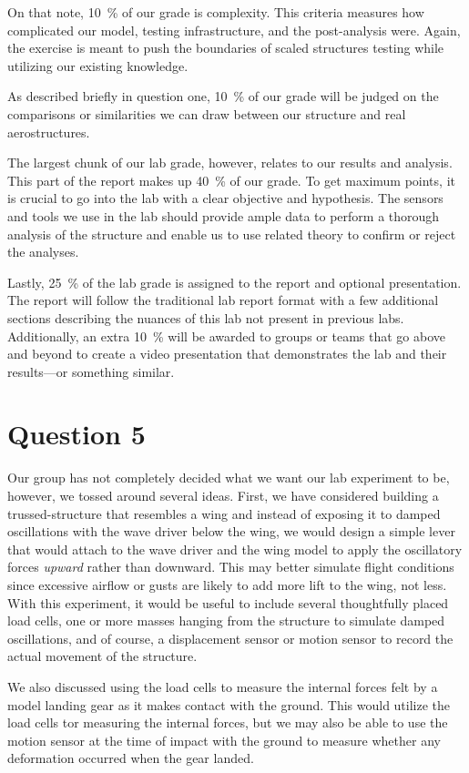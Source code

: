 \documentclass[12 pt]{article}
\begin{document}
On that note, \qty{10}{\percent} of our grade is complexity. This criteria measures how complicated our model, testing infrastructure, and the post-analysis were. Again, the exercise is meant to push the boundaries of scaled structures testing while utilizing our existing knowledge.

As described briefly in question one, \qty{10}{\percent} of our grade will be judged on the comparisons or similarities we can draw between our structure and real aerostructures.

The largest chunk of our lab grade, however, relates to our results and analysis. This part of the report makes up \qty{40}{\percent} of our grade. To get maximum points, it is crucial to go into the lab with a clear objective and hypothesis. The sensors and tools we use in the lab should provide ample data to perform a thorough analysis of the structure and enable us to use related theory to confirm or reject the analyses.

Lastly, \qty{25}{\percent} of the lab grade is assigned to the report and optional presentation. The report will follow the traditional lab report format with a few additional sections describing the nuances of this lab not present in previous labs. Additionally, an extra \qty{10}{\percent} will be awarded to groups or teams that go above and beyond to create a video presentation that demonstrates the lab and their results---or something similar.

\section*{Question 5}
Our group has not completely decided what we want our lab experiment to be, however, we tossed around several ideas. First, we have considered building a trussed-structure that resembles a wing and instead of exposing it to damped oscillations with the wave driver below the wing, we would design a simple lever that would attach to the wave driver and the wing model to apply the oscillatory forces \textit{upward} rather than downward. This may better simulate flight conditions since excessive airflow or gusts are likely to add more lift to the wing, not less. With this experiment, it would be useful to include several thoughtfully placed load cells, one or more masses hanging from the structure to simulate damped oscillations, and of course, a displacement sensor or motion sensor to record the actual movement of the structure.

We also discussed using the load cells to measure the internal forces felt by a model landing gear as it makes contact with the ground. This would utilize the load cells tor measuring the internal forces, but we may also be able to use the motion sensor at the time of impact with the ground to measure whether any deformation occurred when the gear landed.
\end{document}
